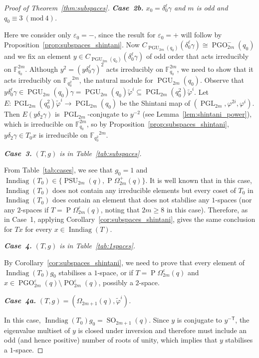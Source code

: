 \documentclass[11pt]{article}
\numberwithin{equation}{section}
\theoremstyle{shdefinition}
\theoremstyle{shplain}
\newcommand{\g}{\gamma}
\renewcommand{\d}{\delta}
\newcommand{\e}{\varepsilon}
\newcommand{\p}{\varphi}
\renewcommand{\wp}{\widetilde{\varphi}}
\newcommand{\<}{\langle}
\renewcommand{\>}{\rangle}
\renewcommand{\geq}{\geqslant}
\newcommand{\Inndiag}{\operatorname{Inndiag}}
\newcommand{\tr}{\mathsf{T}}
\newcommand{\F}{\mathbb{F}}
\renewcommand{\:}{\colon}
\renewcommand{\mod}[1]{\mathrm{ \ } (\mathrm{mod\ } #1)}
\newcommand{\PGL}{\operatorname{PGL}}
\newcommand{\PSU}{\operatorname{PSU}}
\newcommand{\PGU}{\operatorname{PGU}}
\newcommand{\Om}{\Omega}
\newcommand{\SO}{\operatorname{SO}}
\newcommand{\POm}{\operatorname{P}\!\Om}
\newcommand{\PO}{\operatorname{PO}}
\newcommand{\PGO}{\operatorname{PGO}}
\begin{document}
\begin{proof}[Proof of Theorem~\ref{thm:subspaces}]
\emph{\textbf{Case~2b.} $x_0 = \d^\ell_0\g$ and $m$ is odd and $q_0 \equiv 3 \mod{4}$.}\nopagebreak

Here we consider only $\e_0=-$, since the result for $\e_0=+$ will follow by Proposition~\ref{prop:subspaces_shintani}. Now $C_{\PGU_{2m}(q_0)}(\d_0^\ell\g) \cong \PGO^-_{2m}(q_0)$ and we fix an element $y \in C_{\PGU_{2m}(q_0)}(\d_0^\ell\g)$ of odd order that acts irreducibly on $\F_{q_0}^{2m}$. Although $y^2 = (y\d_0^\ell\g)^2$ acts irreducibly on $\F_{q_0}^{2m}$, we need to show that it acts irreducibly on ${\F_{q_0^2}}^{\!\!\!\!\!2m}$, the natural module for $\PGU_{2m}(q_0)$. Observe that $y\d_0^\ell\g \in \PGU_{2m}(q_0)\g = \PGU_{2m}(q_0)\wp^i \subseteq \PGL_{2m}(q_0^2)\wp^i$. Let $E\:\PGL_{2m}(q_0^2)\wp^i \to \PGL_{2m}(q_0)$ be the Shintani map of $(\PGL_{2m},\p^{2i},\p^i)$. Then $E(y\d_2\g)$ is $\PGL_{2m}$-conjugate to $y^{-2}$ (see Lemma~\ref{lem:shintani_power}), which is irreducible on $\F_{q_0}^{2m}$, so by Proposition~\ref{prop:subspaces_shintani}, $y\d_2\g \in T_0x$ is irreducible on ${\F_{q_0^2}}^{\!\!\!\!\!2m}$. \vspace{0.5\baselineskip}

\emph{\textbf{Case~3.} $(T,g)$ is in Table~\ref{tab:subspaces}.}\nopagebreak

From Table~\ref{tab:cases}, we see that $g_0=1$ and $\Inndiag(T_0) \in \{ \PSU_{2m}(q), \POm^+_{2m}(q) \}$. It is well known that in this case, $\Inndiag(T_0)$ does not contain any irreducible elements but every coset of $T_0$ in $\Inndiag(T_0)$ does contain an element that does not stabilise any $1$-spaces (nor any $2$-spaces if $T = \POm^\e_{2m}(q)$, noting that $2m \geq 8$ in this case). Therefore, as in Case~1, applying Corollary~\ref{cor:subspaces_shintani}, gives the same conclusion for $Tx$ for every $x \in \Inndiag(T)$. \vspace{0.5\baselineskip}

\emph{\textbf{Case~4.} $(T,g)$ is in Table~\ref{tab:1spaces}.}\nopagebreak

By Corollary~\ref{cor:subspaces_shintani}, we need to prove that every element of $\Inndiag(T_0)g_0$ stabilises a $1$-space, or if $T = \POm^\e_{2m}(q)$ and $x \in \PGO^\e_{2m}(q) \setminus \PO^\e_{2m}(q)$, possibly a $2$-space.

\emph{\textbf{Case~4a.} $(T,g) = (\Om_{2m+1}(q),\wp^i)$.}\nopagebreak

In this case, $\Inndiag(T_0)g_0 = \SO_{2m+1}(q)$. Since $y$ is conjugate to $y^{-\tr}$, the eigenvalue multiset of $y$ is closed under inversion and therefore must include an odd (and hence positive) number of roots of unity, which implies that $y$ stabilises a $1$-space.


\end{proof}
\end{document}

